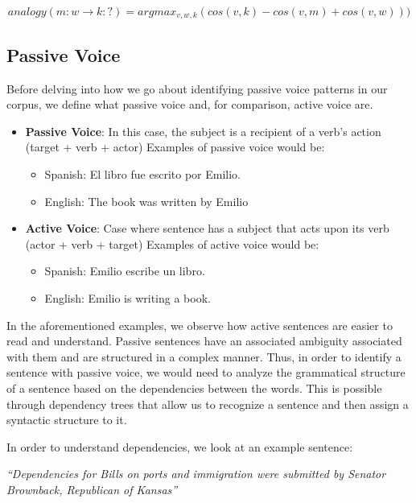 \documentclass{article}
\begin{document}
{{\begin{equation} \label{eu_eqn}
	analogy(m:w \rightarrow k:?) = argmax_{v,w,k}(cos(v,k)-cos(v,m)+cos(v,w)))
\end{equation}

}


\subsection{Passive Voice}{
Before delving into how we go about identifying passive voice patterns in our corpus, we define what passive voice and, for comparison, active voice are.

\begin{itemize}
    \item \textbf{Passive Voice}: In this case, the subject is a recipient of a verb’s action (target + verb + actor) Examples of passive voice would be:
    \begin{itemize}
        \item Spanish: El libro fue escrito por Emilio.
        \item English: The book was written by Emilio
    \end{itemize}

    \item \textbf{Active Voice}: Case where sentence has a subject that acts upon its verb (actor + verb + target) Examples of active voice would be:
    \begin{itemize}
        \item Spanish: Emilio escribe un libro.
        \item English: Emilio is writing a book.
    \end{itemize}
\end{itemize}

In the aforementioned examples, we observe how active sentences are easier to read and understand. Passive sentences have an associated ambiguity associated with them and are structured in a complex manner. Thus, in order to identify a sentence with passive voice, we would need to analyze the grammatical structure of a sentence based on the dependencies between the words. This is possible through dependency trees that allow us to recognize a sentence and then assign a syntactic structure to it.

In order to understand dependencies, we look at an example sentence:

\begin{center}\emph{“Dependencies for Bills on ports and immigration were submitted by Senator Brownback, Republican of Kansas”}
\end{center}

}}
\end{document}
